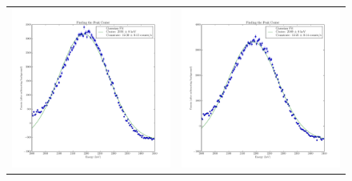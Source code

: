 \documentclass{article}
\begin{document}
\begin{figure}[!htb]
\begin{tabular}{c c}
      \includegraphics[scale=.4]{../plots/peak_center_nolead_portclosed.pdf} & \includegraphics[scale=.4]{../plots/peak_center_nolead_portopen.pdf} \\

\end{tabular}
\end{figure}
\end{document}
